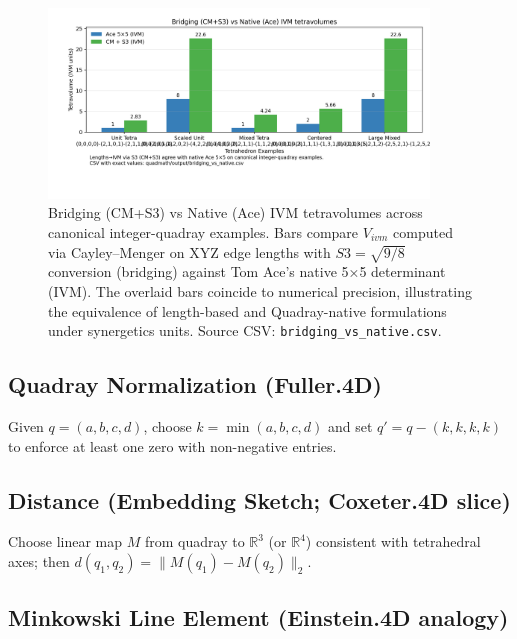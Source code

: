 \documentclass[
  10pt,
]{article}
\begin{document}
\begin{figure}[htbp]
\centering
\includegraphics[width=0.9\textwidth]{figures/bridging_vs_native.png}
\caption{Bridging (CM+S3) vs Native (Ace) IVM tetravolumes across canonical integer-quadray examples. Bars compare $V_{ivm}$ computed via Cayley–Menger on XYZ edge lengths with $S3=\sqrt{9/8}$ conversion (bridging) against Tom Ace's native 5×5 determinant (IVM). The overlaid bars coincide to numerical precision, illustrating the equivalence of length-based and Quadray-native formulations under synergetics units. Source CSV: \texttt{bridging\_vs\_native.csv}.}
\label{fig:bridging_native_eq_appendix}
\end{figure}

\hypertarget{quadray-normalization-fuller.4d}{%
\subsection{Quadray Normalization
(Fuller.4D)}\label{quadray-normalization-fuller.4d}}

Given \(q=(a,b,c,d)\), choose \(k=\min(a,b,c,d)\) and set
\(q' = q - (k,k,k,k)\) to enforce at least one zero with non-negative
entries.

\hypertarget{distance-embedding-sketch-coxeter.4d-slice}{%
\subsection{Distance (Embedding Sketch; Coxeter.4D
slice)}\label{distance-embedding-sketch-coxeter.4d-slice}}

Choose linear map \(M\) from quadray to \(\mathbb{R}^3\) (or
\(\mathbb{R}^4\)) consistent with tetrahedral axes; then
\(d(q_1,q_2) = \lVert M(q_1) - M(q_2) \rVert_2\).

\hypertarget{minkowski-line-element-einstein.4d-analogy}{%
\subsection{Minkowski Line Element (Einstein.4D
analogy)}\label{minkowski-line-element-einstein.4d-analogy}}
\end{document}
